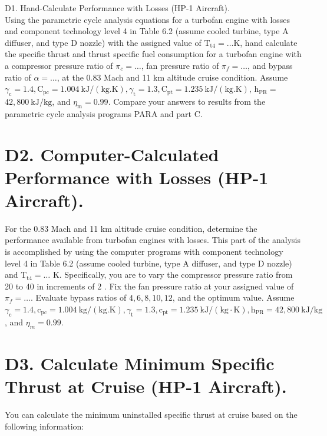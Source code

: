 \documentclass[10pt]{article}
\begin{document}
D1. Hand-Calculate Performance with Losses (HP-1 Aircraft).\\
Using the parametric cycle analysis equations for a turbofan engine with losses and component technology level 4 in Table 6.2 (assume cooled turbine, type A diffuser, and type D nozzle) with the assigned value of $\mathrm{T}_{\mathrm{t} 4}=\ldots \mathrm{K}$, hand calculate the specific thrust and thrust specific fuel consumption for a turbofan engine with a compressor pressure ratio of $\pi_{c}=\ldots$, fan pressure ratio of $\pi_{f}=\ldots$, and bypass ratio of $\alpha=\ldots$, at the 0.83 Mach and 11 km altitude cruise condition. Assume $\gamma_{\mathrm{c}}=1.4, \mathrm{C}_{\mathrm{pc}}=1.004 \mathrm{~kJ} /(\mathrm{kg} . \mathrm{K}), \gamma_{\mathrm{t}}=1.3, \mathrm{C}_{\mathrm{pt}}=1.235 \mathrm{~kJ} /(\mathrm{kg} . \mathrm{K})$, $\mathrm{h}_{\mathrm{PR}}=$ $42,800 \mathrm{~kJ} / \mathrm{kg}$, and $\eta_{\mathrm{m}}=0.99$. Compare your answers to results from the parametric cycle analysis programs PARA and part C.

\section*{D2. Computer-Calculated Performance with Losses (HP-1 Aircraft).}
For the 0.83 Mach and 11 km altitude cruise condition, determine the performance available from turbofan engines with losses. This part of the analysis is accomplished by using the computer programs with component technology level 4 in Table 6.2 (assume cooled turbine, type A diffuser, and type D nozzle) and $\mathrm{T}_{\mathrm{t} 4}=\ldots$ K. Specifically, you are to vary the compressor pressure ratio from 20 to 40 in increments of 2 . Fix the fan pressure ratio at your assigned value of $\pi_{f}=\ldots$. Evaluate bypass ratios of $4,6,8,10,12$, and the optimum value. Assume $\gamma_{\mathrm{c}}=1.4, \mathrm{c}_{\mathrm{pc}}=1.004 \mathrm{~kg} /(\mathrm{kg} . \mathrm{K}), \gamma_{\mathrm{t}}=1.3, \mathrm{c}_{\mathrm{pt}}=1.235 \mathrm{~kJ} /(\mathrm{kg} \cdot \mathrm{K}), \mathrm{h}_{\mathrm{PR}}=42,800 \mathrm{~kJ} / \mathrm{kg}$, and $\eta_{m}=0.99$.

\section*{D3. Calculate Minimum Specific Thrust at Cruise (HP-1 Aircraft).}
You can calculate the minimum uninstalled specific thrust at cruise based on the following information:
\end{document}
